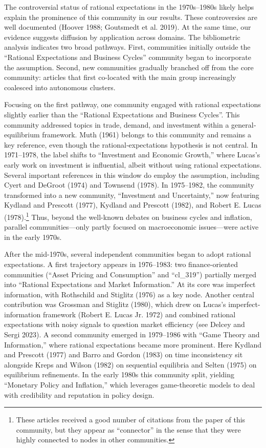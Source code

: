 \documentclass[
]{interact}
\begin{document}
The controversial status of rational expectations in the 1970s--1980s
likely helps explain the prominence of this community in our results.
These controversies are well documented (Hoover 1988; Goutsmedt et al.
2019). At the same time, our evidence suggests diffusion by application
across domains. The bibliometric analysis indicates two broad pathways.
First, communities initially outside the ``Rational Expectations and
Business Cycles'' community began to incorporate the assumption. Second,
new communities gradually branched off from the core community: articles
that first co-located with the main group increasingly coalesced into
autonomous clusters.

Focusing on the first pathway, one community engaged with rational
expectations slightly earlier than the ``Rational Expectations and
Business Cycles''. This community addressed topics in trade, demand, and
investment within a general‐equilibrium framework. Muth (1961) belongs
to this community and remains a key reference, even though the
rational‐expectations hypothesis is not central. In 1971--1978, the
label shifts to ``Investment and Economic Growth,'' where Lucas's early
work on investment is influential, albeit without using rational
expectations. Several important references in this window do employ the
assumption, including Cyert and DeGroot (1974) and Townsend (1978). In
1975--1982, the community transformed into a new community, ``Investment
and Uncertainty,'' now featuring Kydland and Prescott (1977), Kydland
and Prescott (1982), and Robert E. Lucas (1978).\footnote{These articles
  received a good number of citations from the paper of this community,
  but they appear as ``connector'' in the sense that they were highly
  connected to nodes in other communities.} Thus, beyond the well-known
debates on business cycles and inflation, parallel communities---only
partly focused on macroeconomic issues---were active in the early 1970s.

After the mid-1970s, several independent communities began to adopt
rational expectations. A first trajectory appears in 1976--1983: two
finance-oriented communities (``Asset Pricing and Consumption'' and
``cl\_319'') partially merged into ``Rational Expectations and Market
Information.'' At its core was imperfect information, with Rothschild
and Stiglitz (1976) as a key node. Another central contribution was
Grossman and Stiglitz (1980), which drew on Lucas's
imperfect-information framework (Robert E. Lucas Jr. 1972) and combined
rational expectations with noisy signals to question market efficiency
(see Delcey and Sergi 2023). A second community emerged in 1979--1986
with ``Game Theory and Information,'' where rational expectations became
more prominent. Here Kydland and Prescott (1977) and Barro and Gordon
(1983) on time inconsistency sit alongside Kreps and Wilson (1982) on
sequential equilibria and Selten (1975) on equilibrium refinements. In
the early 1980s this community split, yielding ``Monetary Policy and
Inflation,'' which leverages game-theoretic models to deal with
credibility and reputation in policy design.
\end{document}
